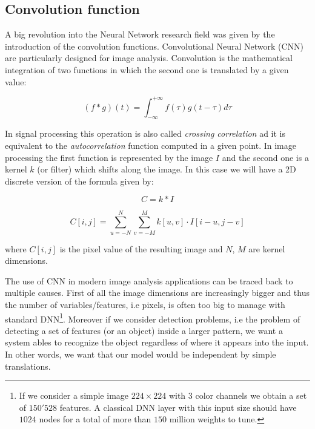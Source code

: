 \documentclass{standalone}
\begin{document}

\subsection[Convolution function]{Convolution function}\label{NN:convolutional}

A big revolution into the Neural Network research field was given by the introduction of the convolution functions.
Convolutional Neural Network (CNN) are particularly designed for image analysis.
Convolution is the mathematical integration of two functions in which the second one is translated by a given value:

$$
(f * g)(t) = \int_{-\infty}^{+\infty} f(\tau)g(t - \tau)d\tau
$$


In signal processing this operation is also called \emph{crossing correlation} ad it is equivalent to the \emph{autocorrelation} function computed in a given point.
In image processing the first function is represented by the image $I$ and the second one is a kernel $k$ (or filter) which shifts along the image.
In this case we will have a 2D discrete version of the formula given by:

$$
C = k * I
$$

$$
C[i, j] = \sum_{u=-N}^{N} \sum_{v=-M}^{M} k[u, v] \cdot I[i - u, j - v]
$$

where $C[i, j]$ is the pixel value of the resulting image and $N$, $M$ are kernel dimensions.

The use of CNN in modern image analysis applications can be traced back to multiple causes.
First of all the image dimensions are increasingly bigger and thus the number of variables/features, i.e pixels, is often too big to manage with standard DNN\footnote{
  If we consider a simple image $224\times224$ with $3$ color channels we obtain a set of $150'528$ features.
  A classical DNN layer with this input size should have $1024$ nodes for a total of more than $150$ million weights to tune.
}.
Moreover if we consider detection problems, i.e the problem of detecting a set of features (or an object) inside a larger pattern, we want a system ables to recognize the object regardless of where it appears into the input.
In other words, we want that our model would be independent by simple translations.
\end{document}
